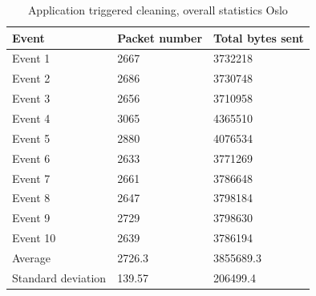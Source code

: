 \begin{table}[H]
\centering
\caption{Application triggered cleaning, overall statistics Oslo}
\label{tab:TCoverallOSL}
\begin{tabular}{|l|l|l|}
\hline
\textbf{Event} & \textbf{Packet number} & \textbf{Total bytes sent} \\ \hline
Event 1        & 2667                   & 3732218                   \\ \hline
Event 2        & 2686                   & 3730748                   \\ \hline
Event 3        & 2656                   & 3710958                   \\ \hline
Event 4        & 3065                   & 4365510                   \\ \hline
Event 5        & 2880                   & 4076534                   \\ \hline
Event 6        & 2633                   & 3771269                   \\ \hline
Event 7        & 2661                   & 3786648                   \\ \hline
Event 8        & 2647                   & 3798184                   \\ \hline
Event 9        & 2729                   & 3798630                   \\ \hline
Event 10       & 2639                   & 3786194                   \\ \hline
Average        & 2726.3                 & 3855689.3                 \\ \hline
Standard deviation        & 139.57
       & 206499.4               \\ \hline
\end{tabular}
\end{table}

